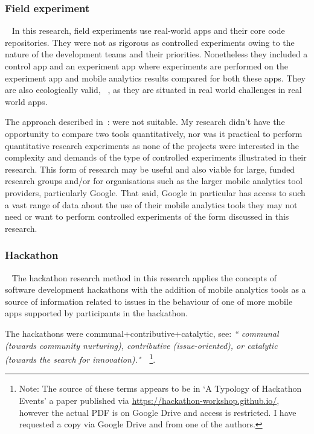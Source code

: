 \subsubsection{Field experiment}~\label{section-field-experiment-method}
In this research, field experiments use real-world apps and their core code repositories. They were not as rigorous as controlled experiments owing to the nature of the development teams and their priorities. Nonetheless they included a control app and an experiment app where experiments are performed on the experiment app and mobile analytics results compared for both these apps. They are also ecologically valid, ~\citep[p.126]{Ko2015_a_practical_guide_to_controlled_experiments_of_sw_eng_tools_with_human_participants}, as they are situated in real world challenges in real world apps.

The approach described in~\citep{Ko2015_a_practical_guide_to_controlled_experiments_of_sw_eng_tools_with_human_participants}: were not suitable. My research didn't have the opportunity to compare two tools quantitatively, nor was it practical to perform quantitative research experiments as none of the projects were interested in the complexity and demands of the type of controlled experiments illustrated in their research. This form of research may be useful and also viable for large, funded research groups and/or for organisations such as the larger mobile analytics tool providers, particularly Google. That said, Google in particular has access to such a vast range of data about the use of their mobile analytics tools they may not need or want to perform controlled experiments of the form discussed in this research.

%
%


\subsubsection{Hackathon}~\label{section-hackathon-research-method}
The hackathon research method in this research applies the concepts of software development hackathons with the addition of mobile analytics tools as a source of information related to issues in the behaviour of one of more mobile apps supported by participants in the hackathon.

The hackathons were communal+contributive+catalytic, see: \emph{`` communal (towards  community  nurturing), contributive  (issue-oriented),  or  catalytic  (towards  the search  for  innovation)."}~\citep[p.3]{medina2020_what_do_we_know_about_hackathons_etc_a_SLR}~\footnote{Note: The source of these terms appears to be in `A Typology of Hackathon Events' a paper published via \url{https://hackathon-workshop.github.io/}, however the actual PDF is on Google Drive and access is restricted. I have requested a copy via Google Drive and from one of the authors.}.

